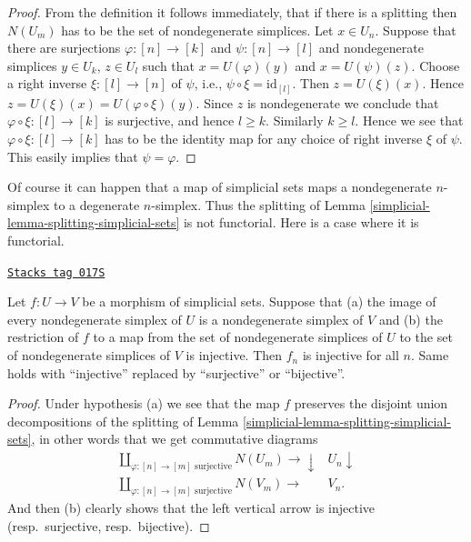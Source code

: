 \begin{proof}
From the definition it follows immediately, that if there is a
splitting then $N(U_m)$ has to be the set of nondegenerate simplices.
Let $x \in U_n$. Suppose that there are surjections $\varphi : [n] \to [k]$
and $\psi : [n] \to [l]$ and nondegenerate simplices
$y \in U_k$, $z \in U_l$ such that $x = U(\varphi)(y)$
and $x = U(\psi)(z)$. Choose a right inverse $\xi : [l] \to [n]$
of $\psi$, i.e., $\psi \circ \xi = \text{id}_{[l]}$.
Then $z = U(\xi)(x)$. Hence $z = U(\xi)(x) = U(\varphi \circ \xi)(y)$.
Since $z$ is nondegenerate we conclude that $\varphi \circ \xi :
[l] \to [k]$ is surjective, and hence $l \geq k$. Similarly
$k \geq l$. Hence we see that $\varphi \circ \xi : [l] \to [k]$
has to be the identity map for any choice of right inverse
$\xi$ of $\psi$. This easily implies that $\psi = \varphi$.
\end{proof}

Of course it can happen that a map of simplicial sets
maps a nondegenerate $n$-simplex to a degenerate $n$-simplex.
Thus the splitting of Lemma \ref{simplicial-lemma-splitting-simplicial-sets}
is not functorial. Here is a case where it is functorial.

\begin{lemma}
\label{simplicial-lemma-injective-map-simplicial-sets}
\href{https://stacks.math.columbia.edu/tag/017S}{\texttt{Stacks tag 017S}}

Let $f : U \to V$ be a morphism of simplicial sets.
Suppose that (a) the image of every nondegenerate simplex of
$U$ is a nondegenerate simplex of $V$ and (b) the restriction
of $f$ to a map from the set of nondegenerate simplices of $U$
to the set of nondegenerate simplices of $V$ is injective.
Then $f_n$ is injective for all $n$.
Same holds with ``injective'' replaced by
``surjective'' or ``bijective''.
\end{lemma}

\begin{proof}

Under hypothesis (a) we see that the map $f$ preserves
the disjoint union decompositions of the splitting
of Lemma \ref{simplicial-lemma-splitting-simplicial-sets}, in other words
that we get commutative diagrams
$$
\begin{array}{cc}\coprod\nolimits_{\varphi : [n] \to [m]\text{ surjective}}
N(U_m)
\longrightarrow\downarrow & U_n \downarrow \\ \coprod\nolimits_{\varphi : [n] \to [m]\text{ surjective}}
N(V_m)
\longrightarrow & V_n.\end{array}
$$
And then (b) clearly shows that the left vertical arrow is
injective (resp.\ surjective, resp.\ bijective).
\end{proof}

